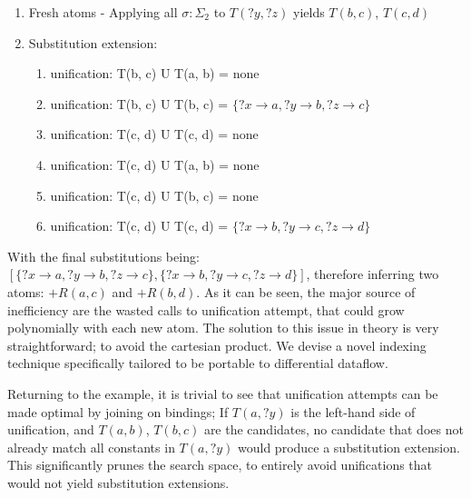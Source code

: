 \documentclass[sigconf,screen,review,natbib]{acmart}
\theoremstyle{definition}
\begin{document}
\begin{enumerate}
\begin{enumerate}
		      \item Fresh atoms - Applying all $\sigma : \Sigma_2$ to $T(?y, ?z)$ yields $T(b, c)$, $T(c, d)$
		      \item Substitution extension: \begin{enumerate}
			            \item unification: T(b, c) U T(a, b) = none
			            \item unification: T(b, c) U T(b, c) = $\{?x \rightarrow a, ?y \rightarrow b, ?z \rightarrow c\}$
			            \item unification: T(c, d) U T(c, d) = none
			            \item unification: T(c, d) U T(a, b) = none
			            \item unification: T(c, d) U T(b, c) = none
			            \item unification: T(c, d) U T(c, d) = $\{?x \rightarrow b, ?y \rightarrow c, ?z \rightarrow d\}$
		            \end{enumerate}
	      \end{enumerate}
\end{enumerate}
With the final substitutions being: $[\{?x \rightarrow a, ?y \rightarrow b, ?z \rightarrow c\}, \{?x \rightarrow b, ?y \rightarrow c, ?z \rightarrow d\}]$, therefore inferring two atoms:
$+R(a, c)$ and $+R(b, d)$. As it can be seen, the major source of inefficiency are the wasted calls to unification attempt, that could
grow polynomially with each new atom. The solution to this issue in theory is very straightforward; to avoid the cartesian product. We
devise a novel indexing technique specifically tailored to be portable to differential dataflow.

Returning to the example, it is trivial to see that unification attempts can be made optimal by joining on bindings; If $T(a, ?y)$ is the
left-hand side of unification, and $T(a, b)$, $T(b, c)$ are the candidates, no candidate that does not already match all constants
in $T(a, ?y)$ would produce a substitution extension. This significantly prunes the search space, to entirely avoid unifications that
would not yield substitution extensions.
\end{document}
